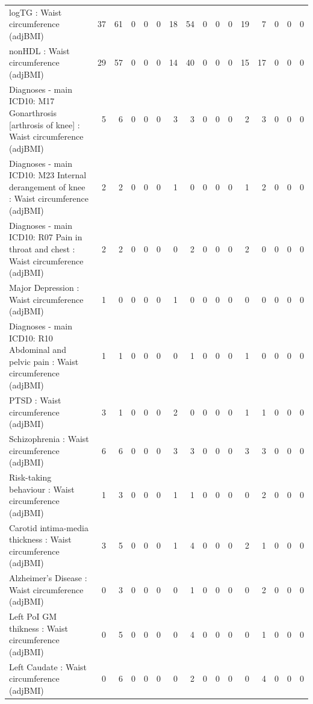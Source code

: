 \begin{table}[ht]
\begin{tabular}{lrrrrrrrrrrrrrrr}
  logTG : Waist circumference (adjBMI) &  37 &  61 &   0 &   0 &   0 &  18 &  54 &   0 &   0 &   0 &  19 &   7 &   0 &   0 &   0 \\ 
  nonHDL : Waist circumference (adjBMI) &  29 &  57 &   0 &   0 &   0 &  14 &  40 &   0 &   0 &   0 &  15 &  17 &   0 &   0 &   0 \\ 
  Diagnoses - main ICD10: M17 Gonarthrosis [arthrosis of knee] : Waist circumference (adjBMI) &   5 &   6 &   0 &   0 &   0 &   3 &   3 &   0 &   0 &   0 &   2 &   3 &   0 &   0 &   0 \\ 
  Diagnoses - main ICD10: M23 Internal derangement of knee : Waist circumference (adjBMI) &   2 &   2 &   0 &   0 &   0 &   1 &   0 &   0 &   0 &   0 &   1 &   2 &   0 &   0 &   0 \\ 
  Diagnoses - main ICD10: R07 Pain in throat and chest : Waist circumference (adjBMI) &   2 &   2 &   0 &   0 &   0 &   0 &   2 &   0 &   0 &   0 &   2 &   0 &   0 &   0 &   0 \\ 
  Major Depression : Waist circumference (adjBMI) &   1 &   0 &   0 &   0 &   0 &   1 &   0 &   0 &   0 &   0 &   0 &   0 &   0 &   0 &   0 \\ 
  Diagnoses - main ICD10: R10 Abdominal and pelvic pain : Waist circumference (adjBMI) &   1 &   1 &   0 &   0 &   0 &   0 &   1 &   0 &   0 &   0 &   1 &   0 &   0 &   0 &   0 \\ 
  PTSD : Waist circumference (adjBMI) &   3 &   1 &   0 &   0 &   0 &   2 &   0 &   0 &   0 &   0 &   1 &   1 &   0 &   0 &   0 \\ 
  Schizophrenia : Waist circumference (adjBMI) &   6 &   6 &   0 &   0 &   0 &   3 &   3 &   0 &   0 &   0 &   3 &   3 &   0 &   0 &   0 \\ 
  Risk-taking behaviour : Waist circumference (adjBMI) &   1 &   3 &   0 &   0 &   0 &   1 &   1 &   0 &   0 &   0 &   0 &   2 &   0 &   0 &   0 \\ 
  Carotid intima-media thickness : Waist circumference (adjBMI) &   3 &   5 &   0 &   0 &   0 &   1 &   4 &   0 &   0 &   0 &   2 &   1 &   0 &   0 &   0 \\ 
  Alzheimer's Disease : Waist circumference (adjBMI) &   0 &   3 &   0 &   0 &   0 &   0 &   1 &   0 &   0 &   0 &   0 &   2 &   0 &   0 &   0 \\ 
  Left PoI GM thikness : Waist circumference (adjBMI) &   0 &   5 &   0 &   0 &   0 &   0 &   4 &   0 &   0 &   0 &   0 &   1 &   0 &   0 &   0 \\ 
  Left Caudate : Waist circumference (adjBMI) &   0 &   6 &   0 &   0 &   0 &   0 &   2 &   0 &   0 &   0 &   0 &   4 &   0 &   0 &   0 \\ 

\end{tabular}
\end{table}
